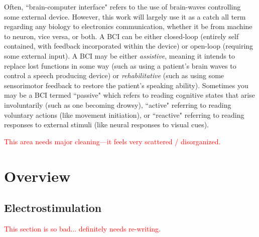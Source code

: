 Often, ``brain-computer interface" refers to the use of brain-waves controlling some external device. However, this work will largely use it as a catch all term regarding any biology to electronics communication, whether it be from machine to neuron, vice versa, or both. A BCI can be either closed-loop (entirely self contained, with feedback incorporated within the device) or open-loop (requiring some external input). A BCI may be either \textit{assistive}, meaning it intends to replace lost functions in some way (such as using a patient's brain waves to control a speech producing device) or \textit{rehabilitative} (such as using some sensorimotor feedback to restore the patient's speaking ability). Sometimes you may be a BCI termed ``passive" which refers to reading cognitive states that arise involuntarily (such as one becoming drowsy), ``active" referring to reading voluntary actions (like movement initiation), or ``reactive" referring to reading responses to external stimuli (like neural responses to visual cues).\newline




\textcolor{red}{This area needs major cleaning---it feels very scattered / disorganized.}\newline


\section{Overview}

\subsection{Electrostimulation}

\textcolor{red}{This section is so bad... definitely needs re-writing.}\newline

